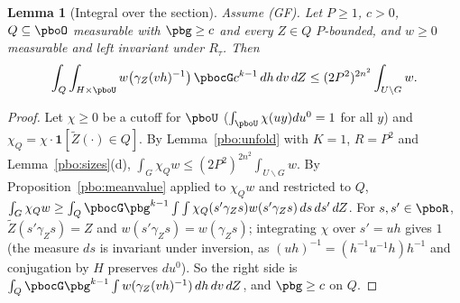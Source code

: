\documentclass[10pt]{amsart}
\newtheorem{lemma}[theorem]{Lemma}
\theoremstyle{definition}
\theoremstyle{remark}
\begin{document}
\begin{lemma}[Integral over the section]\label{pbo:section-int}
Assume \textup{(GF)}. Let $P\ge1$, $c>0$, $Q\subseteq\pboO$ measurable with $\pbg\ge c$ and every
$Z\in Q$ $P$-bounded, and $w\ge0$ measurable and left invariant under $R_\tau$. Then
\[
\int_Q\int_{H\times\pboU}w\bigl(\gamma_Z(vh)^{-1}\bigr)\,\pbocG c^{k-1}\,dh\,dv\,dZ\le(2P^2)^{2n^2}\int_{U
\backslash G}w .
\]
\end{lemma}
\begin{proof}
Let $\chi\ge0$ be a cutoff for $\pboU$ ($\int_{\pboU}\chi(uy)du^0=1$ for all $y$) and $\chi_Q=\chi\cdot\mathbf
1[\tilde Z(\cdot)\in Q]$. By Lemma~\ref{pbo:unfold} with $K=1$, $R=P^2$ and Lemma~\ref{pbo:sizes}(d),
$\int_G\chi_Qw\le(2P^2)^{2n^2}\int_{U\backslash G}w$. By Proposition~\ref{pbo:meanvalue} applied to $\chi_Qw$
and restricted to $Q$, $\int_G\chi_Qw\ge\int_Q\pbocG\pbg^{k-1}\int\int\chi_Q(s'\gamma_Zs)w(s'\gamma_Zs)\,ds\,
ds'\,dZ$. For $s,s'\in\pboR$, $\tilde Z(s'\gamma_Zs)=Z$ and $w(s'\gamma_Zs)=w(\gamma_Zs)$; integrating $\chi$
over $s'=uh$ gives $1$ (the measure $ds$ is invariant under inversion, as $(uh)^{-1}=(h^{-1}u^{-1}h)h^{-1}$
and conjugation by $H$ preserves $du^0$). So the right side is $\int_Q\pbocG\pbg^{k-1}\int w(\gamma_Z(vh)^{-1})
\,dh\,dv\,dZ$, and $\pbg\ge c$ on $Q$.
\end{proof}
\end{document}
